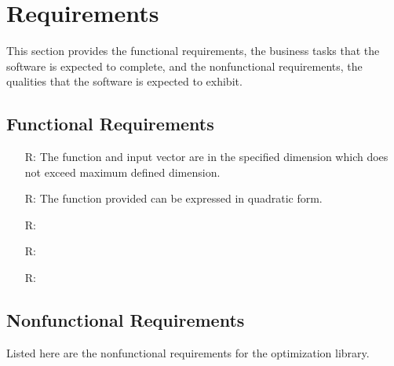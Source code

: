 \documentclass[12pt]{article}
\newcounter{reqnum} %
\begin{document}
\section{Requirements}


This section provides the functional requirements, the business tasks that the
software is expected to complete, and the nonfunctional requirements, the
qualities that the software is expected to exhibit.

\newpage
\subsection{Functional Requirements}

\noindent 
\begin{itemize}

\item[R\refstepcounter{reqnum}\thereqnum \label{r:maxdim}:] The function and input vector are in the specified dimension which does not exceed maximum defined dimension.

\item[R\refstepcounter{reqnum}\thereqnum \label{r:quadratic}:] The function provided can be expressed in quadratic form. 

\item[R\refstepcounter{reqnum}\thereqnum \label{R_Calculate}:] 

\item[R\refstepcounter{reqnum}\thereqnum \label{R_VerifyOutput}:]

\item[R\refstepcounter{reqnum}\thereqnum \label{R_Output}:] 

\end{itemize}

\subsection{Nonfunctional Requirements}

Listed here are the nonfunctional requirements for the optimization library.
\end{document}
